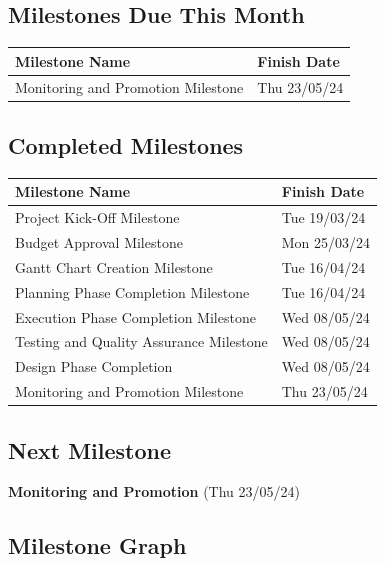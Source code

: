 \subsection*{Milestones Due This Month}
\begin{tabular}{|l|l|}
\hline
\rowcolor{lightblue} Milestone Name & Finish Date \\
\hline
Monitoring and Promotion Milestone & Thu 23/05/24 \\
\hline
\end{tabular}

\subsection*{Completed Milestones}
\begin{tabular}{|l|l|}
\hline
\rowcolor{lightgreen} Milestone Name & Finish Date \\
\hline
Project Kick-Off Milestone & Tue 19/03/24 \\
\hline
Budget Approval Milestone & Mon 25/03/24 \\
\hline
Gantt Chart Creation Milestone & Tue 16/04/24 \\
\hline
Planning Phase Completion Milestone & Tue 16/04/24 \\
\hline
Execution Phase Completion Milestone & Wed 08/05/24 \\
\hline
Testing and Quality Assurance Milestone & Wed 08/05/24 \\
\hline
Design Phase Completion & Wed 08/05/24 \\
\hline
Monitoring and Promotion Milestone & Thu 23/05/24 \\
\hline
\end{tabular}

\subsection*{Next Milestone}
\textbf{Monitoring and Promotion} (Thu 23/05/24)

\subsection*{Milestone Graph}

